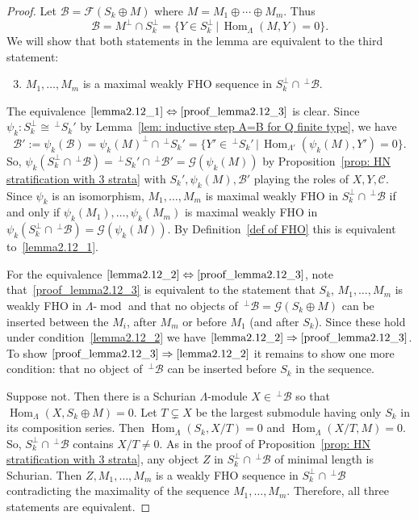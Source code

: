 \documentclass[ALCO,ThmDefs,Unicode,epreuves]{cedram}
\newcommand{\then}{\Rightarrow}
\DeclareMathOperator{\Hom}{Hom}%
\DeclareMathOperator{\modr}{mod}
\newcommand{\cB}{\ensuremath{{\mathcal{B}}}}
\newcommand{\cC}{\ensuremath{{\mathcal{C}}}}
\newcommand{\cF}{\ensuremath{{\mathcal{F}}}}
\newcommand{\cG}{\ensuremath{{\mathcal{G}}}}
\begin{document}
\begin{proof} Let $\cB=\cF(S_k\oplus M)$ where $M=M_1\oplus\cdots\oplus M_m$. Thus 
\[
	\cB=M^\perp\cap S_k^\perp= \{Y\in S_k^\perp\,|\, \Hom_{\Lambda}(M,Y)=0\}.
\]
We will show that both statements in the lemma are equivalent to the third statement:

\begin{enumerate}\setcounter{enumi}{2}
\item\label{proof_lemma2.12_3}  %
$M_1,\ldots,M_m$ is a maximal weakly FHO sequence in $S_k^\perp\cap\,^\perp \cB$.
\end{enumerate}


The equivalence $\eqref{lemma2.12_1}\Leftrightarrow\eqref{proof_lemma2.12_3}$ is clear. Since $\psi_k:S_k^\perp\cong \,^{\perp}S_k'$ by Lemma~\ref{lem: inductive step A=B for Q finite type}, we have
\[
	\cB':=\psi_k(\cB)=\psi_k(M)^\perp\cap \,^\perp S_k'=\{Y'\in\,^{\perp}S_k'\,|\, \Hom_{\Lambda'}(\psi_k(M),Y')=0\}.
\]
So, $\psi_k(S_k^\perp\cap\,^\perp \cB)=\,^{\perp}S_k'\cap\,^\perp\cB'=\cG(\psi_k(M))$ by Proposition~\ref{prop: HN stratification with 3 strata} with $S_k',\psi_k(M),\cB'$ playing the roles of $X,Y,\cC$. Since $\psi_k$ is an isomorphism, $M_1,\ldots,M_m$ is maximal weakly FHO in $S_k^\perp\cap\,^\perp\cB$ if and only if $\psi_k(M_1),\ldots,\psi_k(M_m)$ is maximal weakly FHO in $\psi_k(S_k^\perp\cap\,^\perp \cB)=\cG(\psi_k(M))$. By Definition~\ref{def of FHO} this is equivalent to~\eqref{lemma2.12_1}.


For the equivalence $\eqref{lemma2.12_2}\Leftrightarrow\eqref{proof_lemma2.12_3}$, note that~\eqref{proof_lemma2.12_3} is equivalent to the statement that $S_k$, $M_1,\ldots,M_m$ is weakly FHO in $\Lambda\text{-}\modr $ and that no objects of $\,^\perp\cB=\cG(S_k\oplus M)$ can be inserted between the $M_i$, after $M_m$ or before $M_1$ (and after $S_k$). Since these hold under condition~\eqref{lemma2.12_2} we have $\eqref{lemma2.12_2}\then \eqref{proof_lemma2.12_3}$. To show $\eqref{proof_lemma2.12_3}\then \eqref{lemma2.12_2}$ it remains to show one more condition: that no object of $\,^\perp\cB$ can be inserted before $S_k$ in the sequence.

Suppose not. Then there is a Schurian $\Lambda$-module $X\in\,^\perp\cB$ so that $\Hom_\Lambda(X,S_k\oplus M)=0$. Let $T\subsetneq X$ be the largest submodule having only $S_k$ in its composition series. Then $\Hom_\Lambda(S_k,X/T)=0$ and $\Hom_\Lambda(X/T,M)=0$. So, $S_k^\perp\cap\,^\perp\cB$ contains $X/T\neq0$. As in the proof of Proposition~\ref{prop: HN stratification with 3 strata}, any object $Z$ in $S_k^\perp\cap\,^\perp\cB$ of minimal length is Schurian. Then $Z,M_1,\ldots,M_m$ is a weakly FHO sequence in $S_k^\perp\cap\,^\perp \cB$ contradicting the maximality of the sequence $M_1,\ldots,M_m$. Therefore, all three statements are equivalent.
\end{proof}
\end{document}
